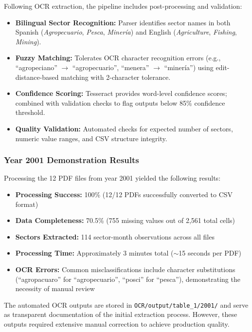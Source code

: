\documentclass[a4paper, fleqn, 11pt]{article}
\newcommand{\filepath}[1]{\texttt{#1}}
\begin{document}
Following OCR extraction, the pipeline includes post-processing and validation:
%
\begin{itemize}
    \item \textbf{Bilingual Sector Recognition:} Parser identifies sector names in both Spanish (\emph{Agropecuario}, \emph{Pesca}, \emph{Minería}) and English (\emph{Agriculture}, \emph{Fishing}, \emph{Mining}).
    \item \textbf{Fuzzy Matching:} Tolerates OCR character recognition errors (e.g., ``agropeciano'' $\rightarrow$ ``agropecuario'', ``menera'' $\rightarrow$ ``minería'') using edit-distance-based matching with 2-character tolerance.
    \item \textbf{Confidence Scoring:} Tesseract provides word-level confidence scores; combined with validation checks to flag outputs below 85\% confidence threshold.
    \item \textbf{Quality Validation:} Automated checks for expected number of sectors, numeric value ranges, and CSV structure integrity.
\end{itemize}

\subsubsection{Year 2001 Demonstration Results}

Processing the 12 PDF files from year 2001 yielded the following results:
%
\begin{itemize}
    \item \textbf{Processing Success:} 100\% (12/12 PDFs successfully converted to CSV format)
    \item \textbf{Data Completeness:} 70.5\% (755 missing values out of 2,561 total cells)
    \item \textbf{Sectors Extracted:} 114 sector-month observations across all files
    \item \textbf{Processing Time:} Approximately 3 minutes total ($\sim$15 seconds per PDF)
    \item \textbf{OCR Errors:} Common misclassifications include character substitutions (``agropacuaro'' for ``agropecuario'', ``posci'' for ``pesca''), demonstrating the necessity of manual review
\end{itemize}

The automated OCR outputs are stored in \filepath{OCR/output/table\_1/2001/} and serve as transparent documentation of the initial extraction process. However, these outputs required extensive manual correction to achieve production quality.
\end{document}
